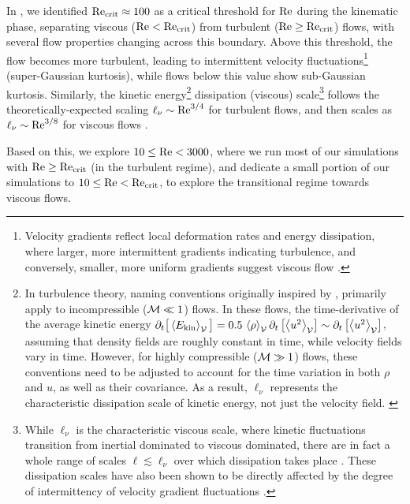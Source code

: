 In , we identified $\mathrm{Re}_\mathrm{crit} \approx 100$ as a critical threshold for $\mathrm{Re}$ during the kinematic phase, separating viscous ($\mathrm{Re} < \mathrm{Re}_\mathrm{crit}$) from turbulent ($\mathrm{Re} \geq \mathrm{Re}_\mathrm{crit}$) flows, with several flow properties changing across this boundary. Above this threshold, the flow becomes more turbulent, leading to intermittent velocity fluctuations\footnote{
    Velocity gradients reflect local deformation rates and energy dissipation, where larger, more intermittent gradients indicating turbulence, and conversely, smaller, more uniform gradients suggest viscous flow \citep{schumacher2014small}.
} (super-Gaussian kurtosis), while flows below this value show sub-Gaussian kurtosis. Similarly, the kinetic energy\footnote{
    In turbulence theory, naming conventions originally inspired by \citet{kolmogorov1941dissipation}, primarily apply to incompressible (\mbox{$\mathcal{M} \ll 1$}) flows. In these flows, the time-derivative of the average kinetic energy $\partial _t\big[\left\langle E_\mathrm{kin} \right\rangle_{\mathcal{V}}\big] = 0.5\, \left\langle \rho \right\rangle_{\mathcal{V}} \partial _t\left[ \left\langle u^2 \right\rangle_{\mathcal{V}} \right] \sim \partial _t\left[ \left\langle u^2 \right\rangle_{\mathcal{V}} \right]$, assuming that density fields are roughly constant in time, while velocity fields vary in time. However, for highly compressible ($\mathcal{M} \gg 1$) flows, these conventions need to be adjusted to account for the time variation in both $\rho$ and $u$, as well as their covariance. As a result, $\ell_\nu$ represents the characteristic dissipation scale of kinetic energy, not just the velocity field.
    \label{note:naming_convesions}
} dissipation (viscous) scale\footnote{
    While $\ell_\nu$ is the characteristic viscous scale, where kinetic fluctuations transition from inertial dominated to viscous dominated, there are in fact a whole range of scales $\ell \lesssim \ell_\nu$ over which dissipation takes place \citep[\eg][]{frisch1991prediction, chen1993far}. These dissipation scales have also been shown to be directly affected by the degree of intermittency of velocity gradient fluctuations \citep[\eg][]{schumacher2007sub}.
} follows the theoretically-expected scaling $\ell_\nu \sim \mathrm{Re}^{3/4}$ \citep{kolmogorov1941dissipation} for turbulent flows, and then scales as $\ell_\nu \sim \mathrm{Re}^{3/8}$ for viscous flows .


Based on this, we explore $10 \leq \mathrm{Re} < 3000$, where we run most of our simulations with $\mathrm{Re} \geq \mathrm{Re}_\mathrm{crit}$ (in the turbulent regime), and dedicate a small portion of our simulations to $10 \leq \mathrm{Re} < \mathrm{Re}_\mathrm{crit}$, to explore the transitional regime towards viscous flows.

